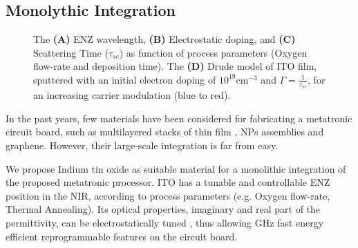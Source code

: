 \subsection{\label{sec:ITO}  Monolythic Integration}

\begin{figure}[ht]
\centering{}
\caption{The \textbf{(A)} ENZ wavelength, \textbf{(B)} Electrostatic doping, and \textbf{(C)} Scattering Time ($\tau_{sc}$) as function of process parameters (Oxygen flow-rate and deposition time). The  \textbf{(D)} Drude model of ITO film, sputtered with an initial electron doping of $10^{19}$cm$^{-3}$ and $\Gamma= \frac{1}{\tau_{sc}}$, for an increasing carrier modulation (blue to red).}
\label{fig:ITO_material}
\end{figure}

\par In the past years, few materials have been considered for fabricating a metatronic circuit board, such as multilayered stacks of thin film \cite{Lie1501790,PhysRevApplied.10.054021} , NPs assemblies and graphene. However, their large-scale integration is far from easy.

\par We propose Indium tin oxide as suitable material for a monolithic integration of the proposed metatronic processor. ITO has a tunable and controllable ENZ position in the NIR, according to process parameters (e.g. Oxygen flow-rate, Thermal Annealing). Its optical properties, imaginary and real part of the permittivity, can be electrostatically tuned \cite{sorger_ultra-compact_2012,amin_0.52_2018}, thus allowing GHz fast\cite{dalir_atto-joule_2018} energy efficient \cite{amin_attojoule_2018} reprogrammable features on the circuit board. 

